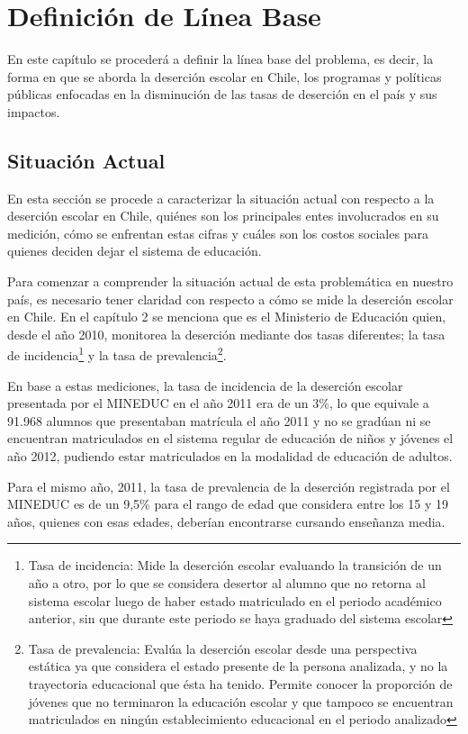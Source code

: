 \chapter{Definición de Línea Base}
En este capítulo se procederá a definir la línea base del problema, es decir, la forma en que se aborda la deserción escolar en Chile, los programas y políticas públicas enfocadas en la disminución de las tasas de deserción en el país y sus impactos.

\section{Situación Actual}
En esta sección se procede a caracterizar la situación actual con respecto a la deserción escolar en Chile, quiénes son los principales entes involucrados en su medición, cómo se enfrentan estas cifras y cuáles son los costos sociales para quienes deciden dejar el sistema de educación.

Para comenzar a comprender la situación actual de esta problemática en nuestro país, es necesario tener claridad con respecto a cómo se mide la deserción escolar en Chile. En el capítulo 2 se menciona que es el Ministerio de Educación quien, desde el año 2010, monitorea la deserción mediante dos tasas diferentes; la tasa de incidencia\footnote{Tasa de incidencia: Mide la deserción escolar evaluando la transición de un año a otro, por lo que se considera desertor al alumno que no retorna al sistema escolar luego de haber estado matriculado en el periodo académico anterior, sin que durante este periodo se haya graduado del sistema escolar} y la tasa de prevalencia\footnote{Tasa de prevalencia: Evalúa la deserción escolar desde una perspectiva estática ya que considera el estado presente de la persona analizada, y no la trayectoria educacional que ésta  ha  tenido. Permite conocer la proporción de jóvenes que no terminaron la educación escolar y que tampoco se encuentran matriculados en ningún establecimiento educacional en el periodo analizado}.

En base a estas mediciones, la tasa de incidencia de la deserción escolar presentada por el MINEDUC en el año 2011 era de un 3\%, lo que equivale a 91.968 alumnos que presentaban matrícula el año 2011 y no se gradúan ni se encuentran matriculados en el sistema regular de educación de niños y jóvenes el año 2012, pudiendo estar matriculados en la modalidad de educación de adultos. 

Para el mismo año, 2011, la tasa de prevalencia de la deserción registrada por el MINEDUC es de un 9,5\% para el rango de edad que considera entre los 15 y 19 años, quienes con esas edades, deberían encontrarse cursando enseñanza media. 

